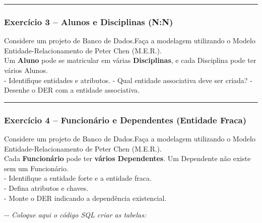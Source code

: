 \documentclass[
]{book}
\newenvironment{Shaded}{\begin{snugshade}}{\end{snugshade}}
\newcommand{\CommentTok}[1]{\textcolor[rgb]{0.56,0.35,0.01}{\textit{#1}}}
\begin{document}


\begin{center}\rule{0.5\linewidth}{0.5pt}\end{center}

\subsubsection{Exercício 3 -- Alunos e Disciplinas (N:N)}\label{exercuxedcio-3-alunos-e-disciplinas-nn}

Considere um projeto de Banco de Dados.Faça a modelagem utilizando o Modelo Entidade-Relacionamento de Peter Chen (M.E.R.).\\
Um \textbf{Aluno} pode se matricular em várias \textbf{Disciplinas}, e cada Disciplina pode ter vários Alunos.\\
- Identifique entidades e atributos. - Qual entidade associativa deve ser criada? - Desenhe o DER com a entidade associativa.



\begin{center}\rule{0.5\linewidth}{0.5pt}\end{center}

\subsubsection{Exercício 4 -- Funcionário e Dependentes (Entidade Fraca)}\label{exercuxedcio-4-funcionuxe1rio-e-dependentes-entidade-fraca}

Considere um projeto de Banco de Dados.Faça a modelagem utilizando o Modelo Entidade-Relacionamento de Peter Chen (M.E.R.).\\
Cada \textbf{Funcionário} pode ter \textbf{vários Dependentes}. Um Dependente não existe sem um Funcionário.\\
- Identifique a entidade forte e a entidade fraca.\\
- Defina atributos e chaves.\\
- Monte o DER indicando a dependência existencial.



\begin{Shaded}
\begin{Highlighting}[]
\CommentTok{{-}{-} Coloque aqui o código SQL criar as tabelas:}


\end{Highlighting}
\end{Shaded}
\end{document}
